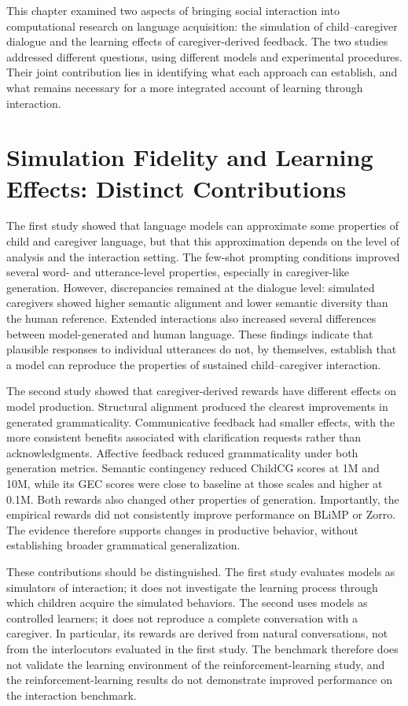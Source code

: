

This chapter examined two aspects of bringing social interaction into computational research on language acquisition: the simulation of child--caregiver dialogue and the learning effects of caregiver-derived feedback. The two studies addressed different questions, using different models and experimental procedures. Their joint contribution lies in identifying what each approach can establish, and what remains necessary for a more integrated account of learning through interaction.

\section{Simulation Fidelity and Learning Effects: Distinct Contributions}

The first study showed that language models can approximate some properties of child and caregiver language, but that this approximation depends on the level of analysis and the interaction setting. The few-shot prompting conditions improved several word- and utterance-level properties, especially in caregiver-like generation. However, discrepancies remained at the dialogue level: simulated caregivers showed higher semantic alignment and lower semantic diversity than the human reference. Extended interactions also increased several differences between model-generated and human language. These findings indicate that plausible responses to individual utterances do not, by themselves, establish that a model can reproduce the properties of sustained child--caregiver interaction.

The second study showed that caregiver-derived rewards have different effects on model production. Structural alignment produced the clearest improvements in generated grammaticality. Communicative feedback had smaller effects, with the more consistent benefits associated with clarification requests rather than acknowledgments. Affective feedback reduced grammaticality under both generation metrics. Semantic contingency reduced ChildCG scores at 1M and 10M, while its GEC scores were close to baseline at those scales and higher at 0.1M. Both rewards also changed other properties of generation. Importantly, the empirical rewards did not consistently improve performance on BLiMP or Zorro. The evidence therefore supports changes in productive behavior, without establishing broader grammatical generalization.

These contributions should be distinguished. The first study evaluates models as simulators of interaction; it does not investigate the learning process through which children acquire the simulated behaviors. The second uses models as controlled learners; it does not reproduce a complete conversation with a caregiver. In particular, its rewards are derived from natural conversations, not from the interlocutors evaluated in the first study. The benchmark therefore does not validate the learning environment of the reinforcement-learning study, and the reinforcement-learning results do not demonstrate improved performance on the interaction benchmark.

